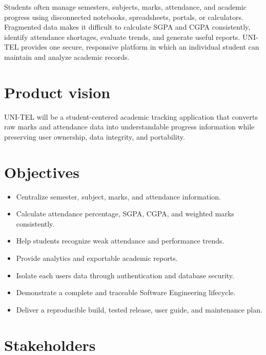 \documentclass[
  10pt,
  a4paper,
  oneside]{report}
\providecommand{\tightlist}{%
  \setlength{\itemsep}{0pt}\setlength{\parskip}{0pt}}
\begin{document}
Students often manage semesters, subjects, marks, attendance, and
academic progress using disconnected notebooks, spreadsheets, portals,
or calculators. Fragmented data makes it difficult to calculate SGPA and
CGPA consistently, identify attendance shortages, evaluate trends, and
generate useful reports. UNI-TEL provides one secure, responsive
platform in which an individual student can maintain and analyze
academic records.

\section{Product vision}\label{42-product-vision}

UNI-TEL will be a student-centered academic tracking application that
converts raw marks and attendance data into understandable progress
information while preserving user ownership, data integrity, and
portability.

\section{Objectives}\label{43-objectives}

\begin{itemize}
\tightlist
\item
  Centralize semester, subject, marks, and attendance information.
\item
  Calculate attendance percentage, SGPA, CGPA, and weighted marks
  consistently.
\item
  Help students recognize weak attendance and performance trends.
\item
  Provide analytics and exportable academic reports.
\item
  Isolate each user\textquotesingle s data through authentication and
  database security.
\item
  Demonstrate a complete and traceable Software Engineering lifecycle.
\item
  Deliver a reproducible build, tested release, user guide, and
  maintenance plan.
\end{itemize}

\section{Stakeholders}\label{44-stakeholders}
\end{document}
